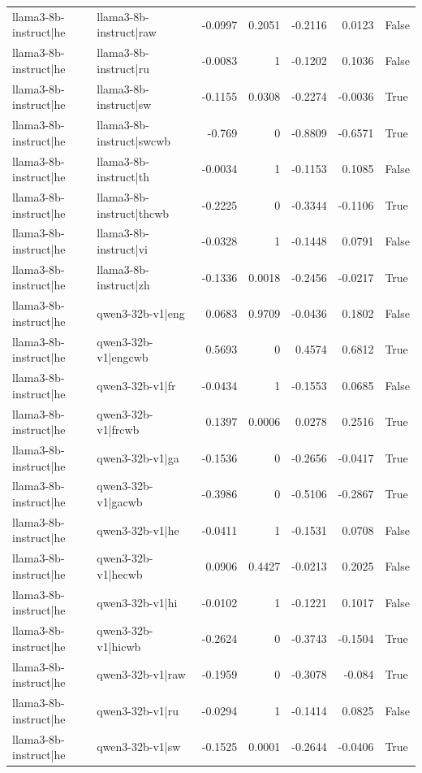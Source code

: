 \begin{table}
\begin{tabular}{l l r r r r l}
llama3-8b-instruct|he & llama3-8b-instruct|raw & -0.0997 & 0.2051 & -0.2116 & 0.0123 & False \\
llama3-8b-instruct|he & llama3-8b-instruct|ru & -0.0083 & 1 & -0.1202 & 0.1036 & False \\
llama3-8b-instruct|he & llama3-8b-instruct|sw & -0.1155 & 0.0308 & -0.2274 & -0.0036 & True \\
llama3-8b-instruct|he & llama3-8b-instruct|swcwb & -0.769 & 0 & -0.8809 & -0.6571 & True \\
llama3-8b-instruct|he & llama3-8b-instruct|th & -0.0034 & 1 & -0.1153 & 0.1085 & False \\
llama3-8b-instruct|he & llama3-8b-instruct|thcwb & -0.2225 & 0 & -0.3344 & -0.1106 & True \\
llama3-8b-instruct|he & llama3-8b-instruct|vi & -0.0328 & 1 & -0.1448 & 0.0791 & False \\
llama3-8b-instruct|he & llama3-8b-instruct|zh & -0.1336 & 0.0018 & -0.2456 & -0.0217 & True \\
llama3-8b-instruct|he & qwen3-32b-v1|eng & 0.0683 & 0.9709 & -0.0436 & 0.1802 & False \\
llama3-8b-instruct|he & qwen3-32b-v1|engcwb & 0.5693 & 0 & 0.4574 & 0.6812 & True \\
llama3-8b-instruct|he & qwen3-32b-v1|fr & -0.0434 & 1 & -0.1553 & 0.0685 & False \\
llama3-8b-instruct|he & qwen3-32b-v1|frcwb & 0.1397 & 0.0006 & 0.0278 & 0.2516 & True \\
llama3-8b-instruct|he & qwen3-32b-v1|ga & -0.1536 & 0 & -0.2656 & -0.0417 & True \\
llama3-8b-instruct|he & qwen3-32b-v1|gacwb & -0.3986 & 0 & -0.5106 & -0.2867 & True \\
llama3-8b-instruct|he & qwen3-32b-v1|he & -0.0411 & 1 & -0.1531 & 0.0708 & False \\
llama3-8b-instruct|he & qwen3-32b-v1|hecwb & 0.0906 & 0.4427 & -0.0213 & 0.2025 & False \\
llama3-8b-instruct|he & qwen3-32b-v1|hi & -0.0102 & 1 & -0.1221 & 0.1017 & False \\
llama3-8b-instruct|he & qwen3-32b-v1|hicwb & -0.2624 & 0 & -0.3743 & -0.1504 & True \\
llama3-8b-instruct|he & qwen3-32b-v1|raw & -0.1959 & 0 & -0.3078 & -0.084 & True \\
llama3-8b-instruct|he & qwen3-32b-v1|ru & -0.0294 & 1 & -0.1414 & 0.0825 & False \\
llama3-8b-instruct|he & qwen3-32b-v1|sw & -0.1525 & 0.0001 & -0.2644 & -0.0406 & True \\

\end{tabular}
\end{table}
